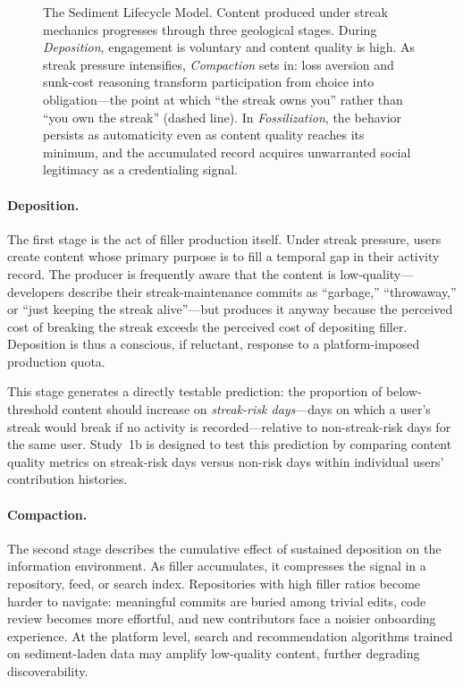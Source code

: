 \documentclass[12pt]{article}
\begin{document}
\begin{figure}[htbp]
\begin{tikzpicture}
\end{tikzpicture}
\caption{The Sediment Lifecycle Model. Content produced under streak mechanics progresses through three geological stages. During \emph{Deposition}, engagement is voluntary and content quality is high. As streak pressure intensifies, \emph{Compaction} sets in: loss aversion and sunk-cost reasoning transform participation from choice into obligation---the point at which ``the streak owns you'' rather than ``you own the streak'' (dashed line). In \emph{Fossilization}, the behavior persists as automaticity even as content quality reaches its minimum, and the accumulated record acquires unwarranted social legitimacy as a credentialing signal.}
\label{fig:lifecycle}
\end{figure}

\paragraph{Deposition.}
The first stage is the act of filler production itself. Under streak pressure, users create content whose primary purpose is to fill a temporal gap in their activity record. The producer is frequently aware that the content is low-quality---developers describe their streak-maintenance commits as ``garbage,'' ``throwaway,'' or ``just keeping the streak alive''---but produces it anyway because the perceived cost of breaking the streak exceeds the perceived cost of depositing filler. Deposition is thus a conscious, if reluctant, response to a platform-imposed production quota.

This stage generates a directly testable prediction: the proportion of below-threshold content should increase on \emph{streak-risk days}---days on which a user's streak would break if no activity is recorded---relative to non-streak-risk days for the same user. Study~1b is designed to test this prediction by comparing content quality metrics on streak-risk days versus non-risk days within individual users' contribution histories.

\paragraph{Compaction.}
The second stage describes the cumulative effect of sustained deposition on the information environment. As filler accumulates, it compresses the signal in a repository, feed, or search index. Repositories with high filler ratios become harder to navigate: meaningful commits are buried among trivial edits, code review becomes more effortful, and new contributors face a noisier onboarding experience. At the platform level, search and recommendation algorithms trained on sediment-laden data may amplify low-quality content, further degrading discoverability.
\end{document}
